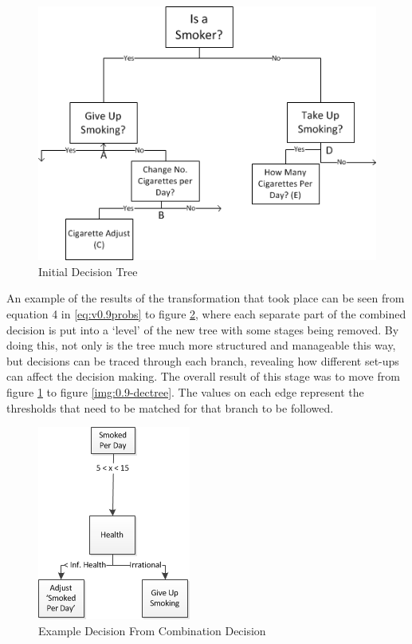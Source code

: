 \documentclass[]{report}
\begin{document}
\begin{figure}
\label{img:init-dectree}
\begin{center}
\includegraphics[scale=0.8]{DecTreeBasic2.png}
\end{center}
\caption{Initial Decision Tree}
\end{figure}

An example of the results of the transformation that took place can be seen from equation 4 in \ref{eq:v0.9probs} to figure \ref{img:example-decision}, where each separate part of the combined decision is put into a `level' of the new tree with some stages being removed. By doing this, not only is the tree much more structured and manageable this way, but decisions can be traced through each branch, revealing how different set-ups can affect the decision making. The overall result of this stage was to move from figure \ref{img:init-dectree} to figure \ref{img:0.9-dectree}. The values on each edge represent the thresholds that need to be matched for that branch to be followed.

\begin{figure}
\label{img:example-decision}
\begin{center}
\includegraphics[scale=1]{example-decision.png}
\end{center}
\caption{Example Decision From Combination Decision}
\end{figure}
\end{document}

